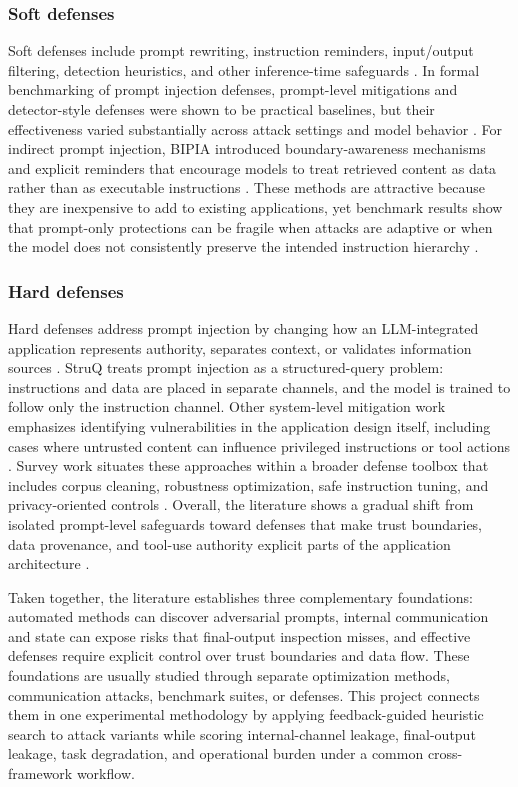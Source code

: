 \subsubsection*{Soft defenses}
Soft defenses include prompt rewriting, instruction reminders, input/output
filtering, detection heuristics, and other inference-time safeguards
\cite{liu2024formalizing,yi2025benchmarking}. In formal benchmarking of prompt
injection defenses, prompt-level mitigations and detector-style defenses were
shown to be practical baselines, but their effectiveness varied substantially
across attack settings and model behavior \cite{liu2024formalizing}. For
indirect prompt injection, BIPIA introduced boundary-awareness mechanisms and
explicit reminders that encourage models to treat retrieved content as data
rather than as executable instructions \cite{yi2025benchmarking}. These
methods are attractive because they are inexpensive to add to existing
applications, yet benchmark results show that prompt-only protections can be
fragile when attacks are adaptive or when the model does not consistently
preserve the intended instruction hierarchy
\cite{liu2024formalizing,yi2025benchmarking}.

\subsubsection*{Hard defenses}
Hard defenses address prompt injection by changing how an LLM-integrated
application represents authority, separates context, or validates information
sources \cite{chen2024struq,jiang2023identifying}. StruQ
\cite{chen2024struq} treats prompt injection as a structured-query problem:
instructions and data are placed in separate channels, and the model is trained
to follow only the instruction channel. Other system-level mitigation work
emphasizes identifying vulnerabilities in the application design itself,
including cases where untrusted content can influence privileged instructions
or tool actions \cite{jiang2023identifying}. Survey work situates these
approaches within a broader defense toolbox that includes corpus cleaning,
robustness optimization, safe instruction tuning, and privacy-oriented
controls \cite{yao2024survey}. Overall, the literature shows a gradual shift
from isolated prompt-level safeguards toward defenses that make trust
boundaries, data provenance, and tool-use authority explicit parts of the
application architecture \cite{chen2024struq,jiang2023identifying,yao2024survey}.

Taken together, the literature establishes three complementary foundations:
automated methods can discover adversarial prompts, internal communication and
state can expose risks that final-output inspection misses, and effective
defenses require explicit control over trust boundaries and data flow. These
foundations are usually studied through separate optimization methods,
communication attacks, benchmark suites, or defenses. This project connects
them in one experimental methodology by applying feedback-guided heuristic
search to attack variants while scoring internal-channel leakage,
final-output leakage, task degradation, and operational burden under a common
cross-framework workflow.

